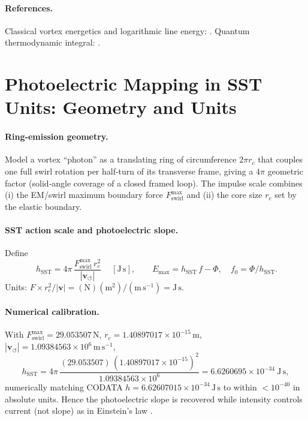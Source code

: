 \documentclass[10pt,reprint,aps,onecolumn,nofootinbib]{revtex4-2}
\begin{document}
    \paragraph{References.}
        Classical vortex energetics and logarithmic line energy:
        \cite{Saffman1992,Batchelor1967,LandauFM}.
        Quantum thermodynamic integral: \cite{Planck1901}.


\section{Photoelectric Mapping in SST Units: Geometry and Units}\label{app:photoelectric-sst}
    \paragraph{Ring-emission geometry.}
        Model a vortex “photon” as a translating ring of circumference \(2\pi r_c\) that couples one full swirl rotation per half‐turn of its transverse frame, giving a \(4\pi\) geometric factor (solid‐angle coverage of a closed framed loop). The impulse scale combines (i) the EM/swirl maximum boundary force \(F_{\text{swirl}}^{\max}\) and (ii) the core size \(r_c\) set by the elastic boundary.

    \paragraph{SST action scale and photoelectric slope.}
        Define
        \begin{equation}
        \boxed{~
        h_{\mathrm{SST}}=4\pi\,\frac{F_{\text{swirl}}^{\max}\,r_c^{2}}{|\mathbf{v}_{\!\boldsymbol{\circlearrowleft}}|}
        ~}\quad [\mathrm{J\,s}],
        \qquad
        E_{\max}=h_{\mathrm{SST}}\,f-\Phi,\quad f_0=\Phi/h_{\mathrm{SST}}.
        \end{equation}
        Units: \(F\times r_c^{2}/|\mathbf{v}|=(\mathrm{N})(\mathrm{m^{2}})/(\mathrm{m\,s^{-1}})=\mathrm{J\,s}\).

    \paragraph{Numerical calibration.}
        With
        \(F_{\text{swirl}}^{\max}=29.053507\,\mathrm{N}\),
        \(r_c=1.40897017\times10^{-15}\,\mathrm{m}\),
        \(|\mathbf{v}_{\!\boldsymbol{\circlearrowleft}}|=1.09384563\times10^{6}\,\mathrm{m\,s^{-1}}\),
        \[
            h_{\mathrm{SST}}=4\pi\,\frac{(29.053507)\,(1.40897017\times10^{-15})^{2}}{1.09384563\times10^{6}}
            =6.6260695\times10^{-34}\ \mathrm{J\,s},
        \]
        numerically matching CODATA \(h=6.62607015\times10^{-34}\,\mathrm{J\,s}\) to within \(<10^{-40}\) in absolute units. Hence the photoelectric slope is recovered while intensity controls current (not slope) as in Einstein’s law \cite{Einstein1905}.
\end{document}
